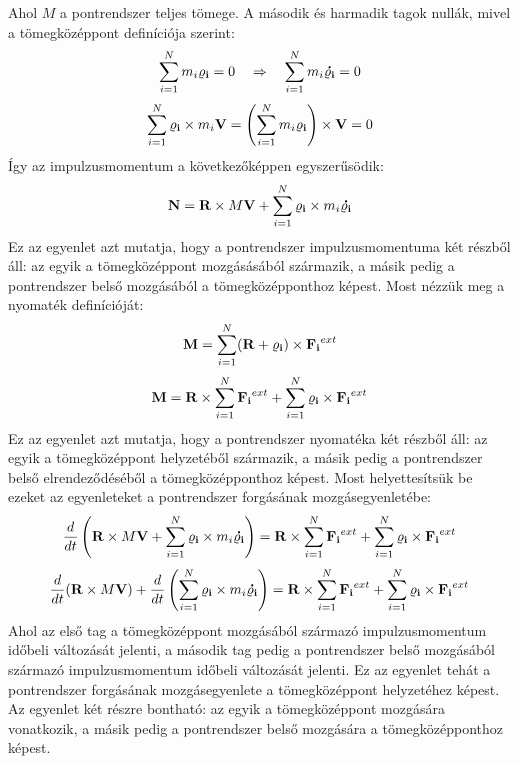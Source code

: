 \documentclass[../main.tex]{subfiles}
\begin{document}
Ahol $M$ a pontrendszer teljes tömege. A második és harmadik tagok nullák, mivel a tömegközéppont definíciója szerint:
\begin{equation}
    \sum_{i=1}^{N} m_i \bold{\varrho_i} = 0 \quad \Rightarrow \quad \sum_{i=1}^{N} m_i \bold{\dot{\varrho_i}} = 0
\end{equation}
\begin{equation}
    \sum_{i=1}^{N} \bold{\varrho_i} \times m_i \bold{V} = \left(\sum_{i=1}^{N} m_i \bold{\varrho_i}\right) \times \bold{V} = 0
\end{equation}
Így az impulzusmomentum a következőképpen egyszerűsödik:
\begin{equation}
    \bold{N} = \bold{R} \times M \bold{V} + \sum_{i=1}^{N} \bold{\varrho_i} \times m_i \bold{\dot{\varrho_i}}
\end{equation}
Ez az egyenlet azt mutatja, hogy a pontrendszer impulzusmomentuma két részből áll: az egyik a tömegközéppont mozgásásából származik, a másik pedig a pontrendszer belső mozgásából a tömegközépponthoz képest.
Most nézzük meg a nyomaték definícióját:
\begin{equation}
    \bold{M} = \sum_{i=1}^{N} (\bold{R} + \bold{\varrho_i}) \times \bold{F_i}^{ext}
\end{equation}
\begin{equation}
    \bold{M} = \bold{R} \times \sum_{i=1}^{N} \bold{F_i}^{ext} + \sum_{i=1}^{N} \bold{\varrho_i} \times \bold{F_i}^{ext}
\end{equation}
Ez az egyenlet azt mutatja, hogy a pontrendszer nyomatéka két részből áll: az egyik a tömegközéppont helyzetéből származik, a másik pedig a pontrendszer belső elrendeződéséből a tömegközépponthoz képest.
Most helyettesítsük be ezeket az egyenleteket a pontrendszer forgásának mozgásegyenletébe:
\begin{equation}
    \frac{d}{dt} \left(\bold{R} \times M \bold{V} + \sum_{i=1}^{N} \bold{\varrho_i} \times m_i \bold{\dot{\varrho_i}}\right) = \bold{R} \times \sum_{i=1}^{N} \bold{F_i}^{ext} + \sum_{i=1}^{N} \bold{\varrho_i} \times \bold{F_i}^{ext}
\end{equation}
\begin{equation}
    \frac{d}{dt} (\bold{R} \times M \bold{V}) + \frac{d}{dt} \left(\sum_{i=1}^{N} \bold{\varrho_i} \times m_i \bold{\dot{\varrho_i}}\right) = \bold{R} \times \sum_{i=1}^{N} \bold{F_i}^{ext} + \sum_{i=1}^{N} \bold{\varrho_i} \times \bold{F_i}^{ext}
\end{equation}
Ahol az első tag a tömegközéppont mozgásából származó impulzusmomentum időbeli változását jelenti, a második tag pedig a pontrendszer belső mozgásából származó impulzusmomentum időbeli változását jelenti.
Ez az egyenlet tehát a pontrendszer forgásának mozgásegyenlete a tömegközéppont helyzetéhez képest. Az egyenlet két részre bontható: az egyik a tömegközéppont mozgására vonatkozik, a másik pedig a pontrendszer belső mozgására a tömegközépponthoz képest.
\end{document}
